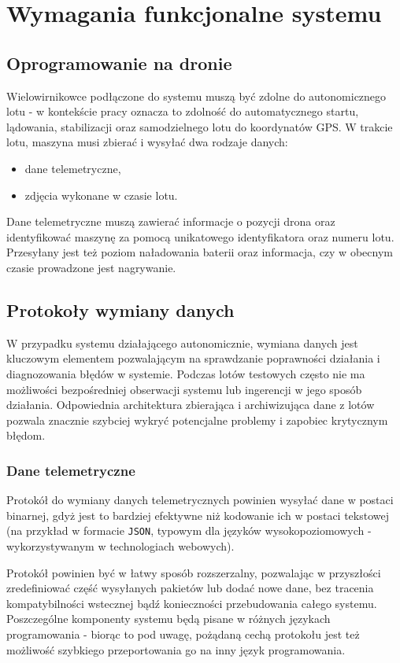 \chapter{Wymagania funkcjonalne systemu}

\section{Oprogramowanie na dronie}

Wielowirnikowce podłączone do systemu muszą być
zdolne do autonomicznego lotu - w kontekście pracy
oznacza to zdolność do automatycznego startu,
lądowania, stabilizacji oraz samodzielnego
lotu do koordynatów GPS. W trakcie lotu, maszyna musi
zbierać i wysyłać dwa rodzaje danych:
\begin{itemize}
    \item dane telemetryczne,
    \item zdjęcia wykonane w czasie lotu.
\end{itemize}

Dane telemetryczne muszą zawierać informacje o pozycji
drona oraz identyfikować maszynę za pomocą unikatowego
identyfikatora oraz numeru lotu. Przesyłany jest też
poziom naładowania baterii oraz informacja, czy w obecnym
czasie prowadzone jest nagrywanie.

\section{Protokoły wymiany danych}

W przypadku systemu działającego autonomicznie, wymiana danych jest kluczowym
elementem pozwalającym na sprawdzanie poprawności działania
i diagnozowania błędów w systemie. Podczas lotów testowych
często nie ma możliwości bezpośredniej obserwacji systemu
lub ingerencji w jego sposób działania. Odpowiednia architektura
zbierająca i archiwizująca dane z lotów pozwala znacznie szybciej 
wykryć potencjalne problemy i zapobiec krytycznym błędom. 

\subsection{Dane telemetryczne}
Protokół do wymiany danych telemetrycznych powinien
wysyłać dane w postaci binarnej, gdyż jest to bardziej
efektywne niż kodowanie ich w postaci tekstowej (na
przykład w formacie \texttt{JSON}, typowym dla języków
wysokopoziomowych - wykorzystywanym w technologiach webowych).

Protokół powinien być w łatwy sposób rozszerzalny,
pozwalając w przyszłości zredefiniować część wysyłanych
pakietów lub dodać nowe dane, bez tracenia kompatybilności
wstecznej bądź konieczności przebudowania całego systemu.
Poszczególne komponenty systemu będą pisane w różnych
językach programowania - biorąc to pod uwagę, pożądaną
cechą protokołu jest też możliwość szybkiego przeportowania
go na inny język programowania. 

